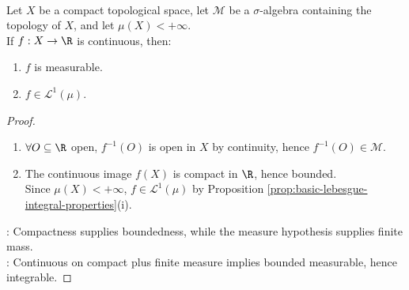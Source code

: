 \begin{corollary} \label{cor:compact-continuous-finite-measure-integrable} \\
Let $X$ be a compact topological space, let $\mathcal{M}$ be a $\sigma$-algebra containing the topology of $X$, and let $\mu(X)<+\infty$.\\
If $f:X\to\R$ is continuous, then:
\begin{enumerate}[label=(\roman*)]
\setlength{\itemsep}{0pt}
\item $f$ is measurable.
\item $f\in\mathscr{L}^1(\mu)$.
\end{enumerate}
\begin{proof}
\begin{enumerate}[label=(\roman*)]
\setlength{\itemsep}{0pt}
\item $\forall O\subseteq\R$ open, $f^{-1}(O)$ is open in $X$ by continuity, hence $f^{-1}(O)\in\mathcal{M}$.
\item The continuous image $f(X)$ is compact in $\R$, hence bounded.\\
Since $\mu(X)<+\infty$, $f\in\mathscr{L}^1(\mu)$ by Proposition \ref{prop:basic-lebesgue-integral-properties}(i).
\end{enumerate}
: Compactness supplies boundedness, while the measure hypothesis supplies finite mass.\\
: Continuous on compact plus finite measure implies bounded measurable, hence integrable.
\end{proof}
\end{corollary}

